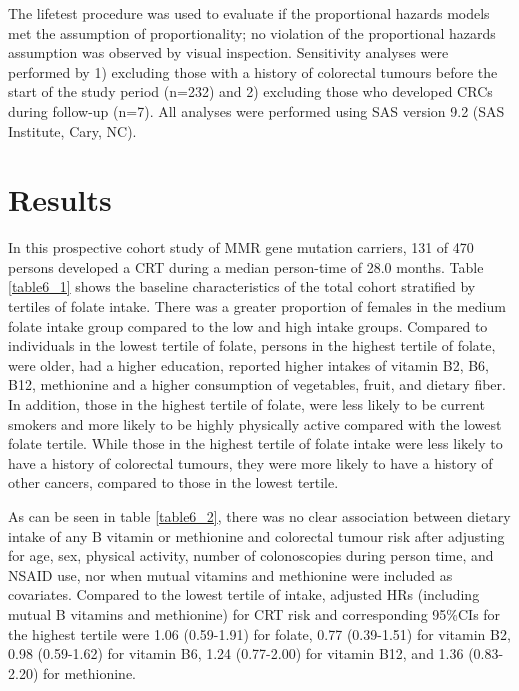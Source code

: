 \noindent The lifetest procedure was used to evaluate if the proportional hazards models met the assumption of proportionality; no violation of the proportional hazards assumption was observed by visual inspection. Sensitivity analyses were performed by 1) excluding those with a history of colorectal tumours before the start of the study period (n=232) and 2) excluding those who developed CRCs during follow-up (n=7). All analyses were performed using SAS version 9.2 (SAS Institute, Cary, NC).

\section{Results} %
\noindent In this prospective cohort study of MMR gene mutation carriers, 131 of 470 persons developed a CRT during a median person-time of 28.0 months. Table \ref{table6_1} shows the baseline characteristics of the total cohort stratified by tertiles of folate intake. There was a greater proportion of females in the medium folate intake group compared to the low and high intake groups. Compared to individuals in the lowest tertile of folate, persons in the highest tertile of folate, were older, had a higher education, reported higher intakes of vitamin B2, B6, B12, methionine and a higher consumption of vegetables, fruit, and dietary fiber. In addition, those in the highest tertile of folate, were less likely to be current smokers and more likely to be highly physically active compared with the lowest folate tertile. While those in the highest tertile of folate intake were less likely to have a history of colorectal tumours, they were more likely to have a history of other cancers, compared to those in the lowest tertile.

\noindent As can be seen in table \ref{table6_2}, there was no clear association between dietary intake of any B vitamin or methionine and colorectal tumour risk after adjusting for age, sex, physical activity, number of colonoscopies during person time, and NSAID use, nor when mutual vitamins and methionine were included as covariates. Compared to the lowest tertile of intake, adjusted HRs (including mutual B vitamins and methionine) for CRT risk and corresponding 95\%CIs for the highest tertile were 1.06 (0.59-1.91) for folate, 0.77 (0.39-1.51) for vitamin B2, 0.98 (0.59-1.62) for vitamin B6, 1.24 (0.77-2.00) for vitamin B12, and 1.36 (0.83-2.20) for methionine.

